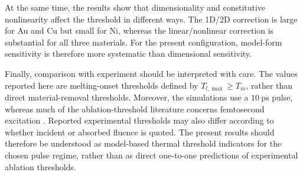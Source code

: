 At the same time, the results show that dimensionality and constitutive
nonlinearity affect the threshold in different ways. The 1D/2D correction
is large for Au and Cu but small for Ni, whereas the linear/nonlinear
correction is substantial for all three materials. For the present
configuration, model-form sensitivity is therefore more systematic than
dimensional sensitivity.

Finally, comparison with experiment should be interpreted with care.
The values reported here are melting-onset thresholds defined by
\(T_{l,\max}\ge T_m\), rather than direct material-removal thresholds.
Moreover, the simulations use a \(\SI{10}{\pico\second}\) pulse, whereas
much of the ablation-threshold literature concerns femtosecond excitation
\cite{Hashida_2001,Gamaly_2002,Forster_2021}. Reported experimental
thresholds may also differ according to whether incident or absorbed
fluence is quoted. The present results should therefore be understood as
model-based thermal threshold indicators for the chosen pulse regime,
rather than as direct one-to-one predictions of experimental ablation
thresholds.
